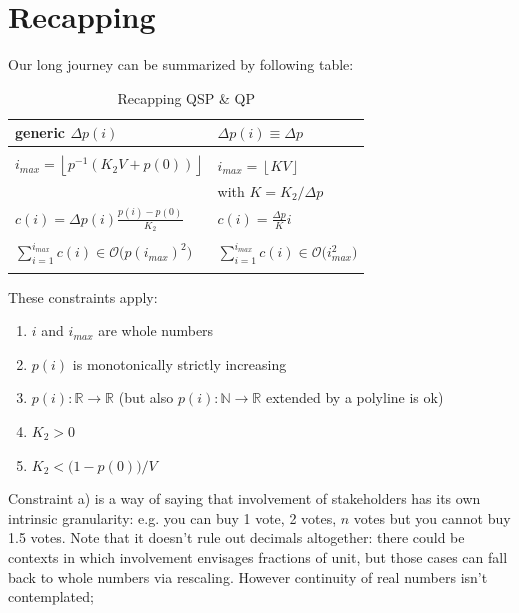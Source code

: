 \documentclass[10pt,a4paper]{article}
\begin{document}
	\section{Recapping}
	Our long journey can be summarized by following table:
	\begin{table}[H]
		\begin{center}
			\begin{tabular}{l|l}
				\toprule
				generic $\Delta p(i)$ & $\Delta p(i) \equiv \Delta p$ \\
				\midrule
				& \\
				$i_{max}=\left\lfloor p^{-1}(K_{2}V+p(0)) \right\rfloor$ \qquad \qquad & $i_{max}=\left\lfloor KV \right\rfloor$ \\
				& \qquad \qquad \qquad \quad with $K=K_{2}/\Delta p$\\
				$c(i)=\Delta p(i) \displaystyle\frac{p(i)-p(0)}{K_{2}}$ \qquad \qquad & 
				$c(i) = \displaystyle\frac{\Delta p}{K} i$ \\
				& \\
				$\displaystyle\sum_{i=1}^{i_{max}} c(i) \in \mathcal{O}\big(p(i_{max})^2\big)$ \qquad \qquad & $\displaystyle\sum_{i=1}^{i_{max}} c(i) \in \mathcal{O}\big(i_{max}^2\big)$ \\
				& \\
				\bottomrule 
			\end{tabular}
			\caption{Recapping QSP \& QP}
			\label{tab:recapping}
		\end{center}
	\end{table}
	These constraints apply:
	\begin{enumerate}[label=\alph*)]
		\item $i$ and $i_{max}$	are whole numbers
		\item $p(i)$ is monotonically strictly increasing
		\item $p(i):\mathbb{R} \rightarrow \mathbb{R}$ (but also $p(i):\mathbb{N} \rightarrow \mathbb{R}$ extended by a polyline is ok)
		\item $K_{2}>0$
		\item $K_{2}<\big(1-p(0)\big)/V$
	\end{enumerate}

	Constraint a) is a way of saying that involvement of stakeholders has its own intrinsic granularity: e.g. you can buy 1 vote, 2 votes, $n$ votes but you cannot buy 1.5 votes. Note that it doesn’t rule out decimals altogether: there could be contexts in which involvement envisages fractions of unit, but those cases can fall back to whole numbers via rescaling. However continuity of real numbers isn’t contemplated;
	
\end{document}
